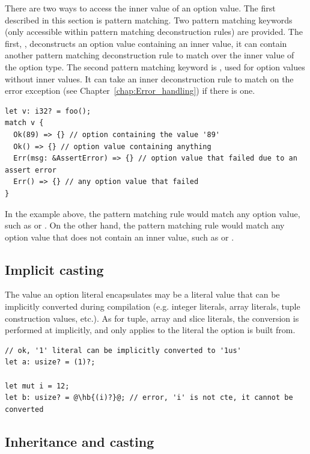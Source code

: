 There are two ways to access the inner value of an option value. The first
described in this section is pattern matching. Two pattern matching keywords
(only accessible within pattern matching deconstruction rules) are provided. The
first, , deconstructs an option value containing an inner
value, it can contain another pattern matching deconstruction rule to match over
the inner value of the option type. The second pattern matching keyword is
, used for option values without inner values. It can take an inner
deconstruction rule to match on the error exception (see
Chapter~\ref{chap:Error_handling}) if there is one.

\begin{lstlisting}[style=coloredverbatimError]
let v: i32? = foo();
match v {
  Ok(89) => {} // option containing the value '89'
  Ok() => {} // option value containing anything
  Err(msg: &AssertError) => {} // option value that failed due to an assert error
  Err() => {} // any option value that failed
}
\end{lstlisting}

In the example above, the  pattern matching rule would match any
option value, such as  or . On the other hand, the
 pattern matching rule would match any option value that does not
contain an inner value, such as  or .


\subsection{Implicit casting}

The value an option literal encapsulates may be a literal value that can be
implicitly converted during compilation (e.g. integer literals, array literals,
tuple construction values, etc.). As for tuple, array and slice literals, the
conversion is performed at  implicitly, and only applies to the
literal the option is built from.

\begin{lstlisting}[style=coloredverbatimError, escapechar=@]
// ok, '1' literal can be implicitly converted to '1us'
let a: usize? = (1)?;

let mut i = 12;
let b: usize? = @\hb{(i)?}@; // error, 'i' is not cte, it cannot be converted
\end{lstlisting}

\subsection{Inheritance and casting}

